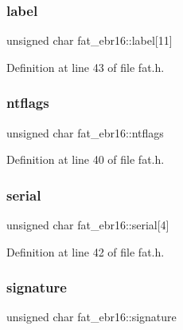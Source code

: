 \subsubsection{\texorpdfstring{label}{label}}
{\footnotesize\ttfamily unsigned char fat\+\_\+ebr16\+::label\mbox{[}11\mbox{]}}



Definition at line 43 of file fat.\+h.

\mbox{\label{structfat__ebr16_a90f6b7d2156bc0f3d709e82c08a1cad4_a90f6b7d2156bc0f3d709e82c08a1cad4}} 
\subsubsection{\texorpdfstring{ntflags}{ntflags}}
{\footnotesize\ttfamily unsigned char fat\+\_\+ebr16\+::ntflags}



Definition at line 40 of file fat.\+h.

\mbox{\label{structfat__ebr16_a9f3f3907a47eab25db8ffaacf339848f_a9f3f3907a47eab25db8ffaacf339848f}} 
\subsubsection{\texorpdfstring{serial}{serial}}
{\footnotesize\ttfamily unsigned char fat\+\_\+ebr16\+::serial\mbox{[}4\mbox{]}}



Definition at line 42 of file fat.\+h.

\mbox{\label{structfat__ebr16_a366424b6b0e4cc2cc3a48fb291cdddf1_a366424b6b0e4cc2cc3a48fb291cdddf1}} 
\subsubsection{\texorpdfstring{signature}{signature}}
{\footnotesize\ttfamily unsigned char fat\+\_\+ebr16\+::signature}



